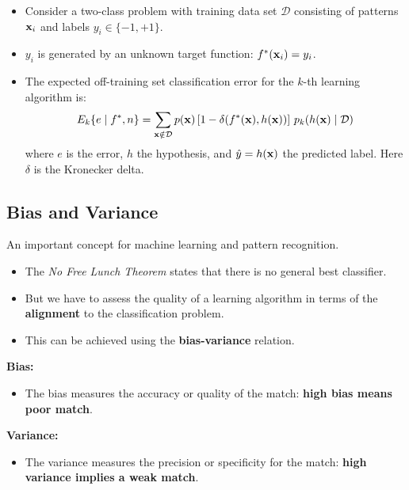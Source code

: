   \begin{itemize}
    \item Consider a two-class problem with training data set ${\mathcal{D}}$ consisting of patterns $\bm{\mathrm{x}}_i$ and labels $y_i\in\{-1,+1\}$. 
    \item $y_i$ is generated by an unknown target function: $f^*(\bm{\mathrm{x}}_i) = y_i$.
    \item The expected off-training set classification error for the $k$-th learning algorithm is:
      \begin{displaymath}
        E_k \{e \mid f^*, n\} = \sum_{\bm{\mathrm{x}} \notin {\mathcal{D}}} p(\bm{\mathrm{x}}) \left[ 1 - \delta(f^*(\bm{\mathrm{x}}), h(\bm{\mathrm{x}})) \right] \, p_k(h(\bm{\mathrm{x}}) \mid {\mathcal{D}})
      \end{displaymath}
      where $e$ is the error, $h$ the hypothesis, and $\hat y=h(\bm{\mathrm{x}})$ the predicted label. Here $\delta$ is the Kronecker delta.
  \end{itemize}

\subsection{Bias and Variance}
An important concept for machine learning and pattern recognition. 

 \begin{itemize}
    \item The \emph{No Free Lunch Theorem} states that there is no general best classifier.            
    \item But we have to assess the quality of a learning algorithm in terms of the \textbf        {alignment} to the classification problem.            
    \item This can be achieved using the \textbf        {bias-variance} relation.
  \end{itemize}
 
 \textbf {Bias:}
  \begin{itemize}
    \item The bias measures the accuracy or quality of the match:
     \textbf{high bias means poor match}.
  \end{itemize}
         

 \textbf{Variance:}
  \begin{itemize}
    \item The variance measures the precision or specificity for the match: 
     \textbf {high variance implies a weak match}.
  \end{itemize}
        
